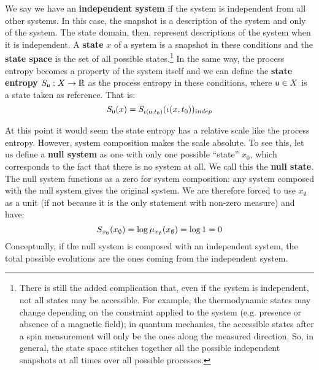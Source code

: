 \documentclass[letterpaper]{article}
\begin{document}
We say we have an \textbf{independent system} if the system is independent from all other systems. In this case, the snapshot is a description of the system and only of the system. The state domain, then, represent descriptions of the system when it is independent. A \textbf{state} $x$ of a system is a snapshot in these conditions and the \textbf{state space} is the set of all possible states.\footnote{There is still the added complication that, even if the system is independent, not all states may be accessible. For example, the thermodynamic states may change depending on the constraint applied to the system (e.g. presence or absence of a magnetic field); in quantum mechanics, the accessible states after a spin measurement will only be the ones along the measured direction. So, in general, the state space stitches together all the possible independent snapshots at all times over all possible processes.} In the same way, the process entropy becomes a property of the system itself and we can define the \textbf{state entropy} $S_{\stmt[u]} : X \to \mathbb{R}$ as the process entropy in these conditions, where $\stmt[u] \in X$ is a state taken as reference. That is:
\begin{equation}
	S_{\stmt[u]}(x) = S_{\iota(\stmt[u], t_0)}(\iota( x, t_0))_{indep}
\end{equation}

At this point it would seem the state entropy has a relative scale like the process entropy. However, system composition makes the scale absolute. To see this, let us define a \textbf{null system} as one with only one possible ``state'' $x_0$, which corresponds to the fact that there is no system at all. We call this the \textbf{null state}. The null system functions as a zero for system composition:  any system composed with the null system gives the original system. We are therefore forced to use $x_\emptyset$ as a unit (if not because it is the only statement with non-zero measure) and have:
\begin{equation}\label{entropy_zero}
S_{x_\emptyset}(x_\emptyset) = \log \mu_{x_\emptyset}(x_\emptyset) = \log 1 = 0 \\
\end{equation} 
Conceptually, if the null system is composed with an independent system, the total possible evolutions are the ones coming from the independent system.
\end{document}
